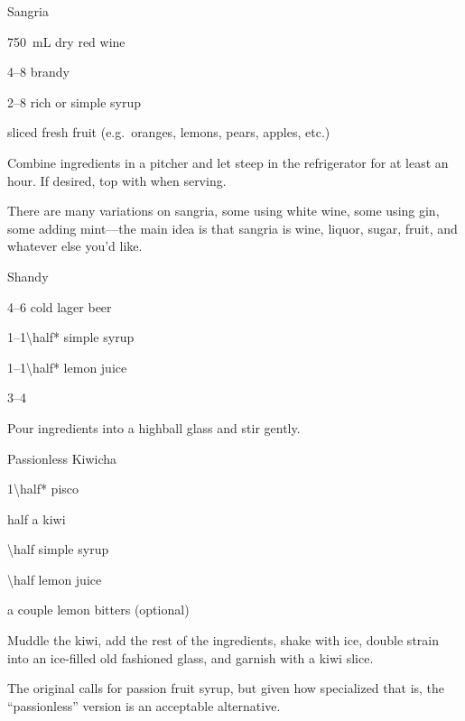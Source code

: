 \begin{Cocktail}{Sangria}
	\begin{Ingredients}
	\item \SI{750}{\milli\liter} dry red wine
	\item \SIrange{4}{8}{\oz} brandy
	\item \SIrange{2}{8}{\oz} rich or simple syrup
	\item sliced fresh fruit (e.g.\ oranges, lemons, pears, apples, etc.)
	\end{Ingredients}
	
	\begin{Instructions}
	Combine ingredients in a pitcher and let steep in the refrigerator for at least an hour.  If desired, top with \soda\/ when serving.
	
	There are many variations on sangria, some using white wine, some using gin, some adding mint---the main idea is that sangria is wine, liquor, sugar, fruit, and whatever else you'd like.
	\end{Instructions}
\end{Cocktail}

\begin{Cocktail}{Shandy}
	\begin{Ingredients}
	\item \SIrange{4}{6}{\oz} cold lager beer
	\item \SIrange{1}{1\half*}{\oz} simple syrup
	\item \SIrange{1}{1\half*}{\oz} lemon juice
	\item \SIrange{3}{4}{\oz} \soda\/
	\end{Ingredients}
	
	\begin{Instructions}
	Pour ingredients into a highball glass and stir gently.
	\end{Instructions}
\end{Cocktail}

\begin{Cocktail}{Passionless Kiwicha}
	\begin{Ingredients}
	\item \SI{1\half*}{\oz} pisco
	\item half a kiwi
	\item \SI{\half}{\oz} simple syrup
	\item \SI{\half}{\oz} lemon juice
	\item a couple \si{\dashes} lemon bitters (optional)
	\end{Ingredients}
	
	\begin{Instructions}\small
	Muddle the kiwi, add the rest of the ingredients, shake with ice, double strain into an ice-filled old fashioned glass, and garnish with a kiwi slice.
	
	The original  calls for passion fruit syrup, but given how specialized that is, the ``passionless'' version is an acceptable alternative.
	\end{Instructions}
\end{Cocktail}

